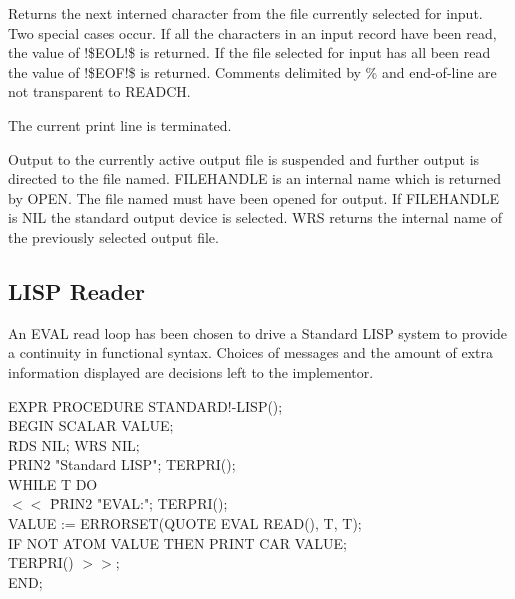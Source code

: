 {Returns the next interned character from the file currently selected
for input. Two special cases occur. If all the characters in an input
  record have been read,
the value of !\$EOL!\$ is returned. If the file selected for input has
all been read the value of !\$EOF!\$ is returned. Comments delimited
by \% and end-of-line are not transparent to READCH.  }


{The current print line is terminated.}


{Output to the currently active output file is suspended and further
output is directed to the file named. FILEHANDLE is an internal name
which is returned by OPEN. The file named must have been opened for
output. If FILEHANDLE is NIL the standard output device is selected.
 
WRS returns the internal name of the previously selected output file.

}

\subsection{LISP Reader}

An EVAL read loop has been chosen to drive a Standard LISP system to
provide a continuity in functional syntax. Choices of messages and the
amount of extra information displayed are decisions left to the
implementor.

{\tt \begin{tabbing} EXPR PROCEDURE STANDARD!-LISP(); \\ BEGIN SCALAR
VALUE; \\
\hspace*{2em} \= RDS NIL;  WRS NIL; \\
\> PRIN2 "Standard LISP"; TERPRI(); \\
\> WHILE T DO \\
\> \hspace*{1em} $<<$ \= PRIN2 "EVAL:"; TERPRI(); \\
\> \> VALUE := ERRORSET(QUOTE EVAL READ(), T, T); \\
\> \> IF NOT ATOM VALUE THEN PRINT CAR VALUE; \\
\> \> TERPRI() $>>$; \\
END;
\end{tabbing}}

